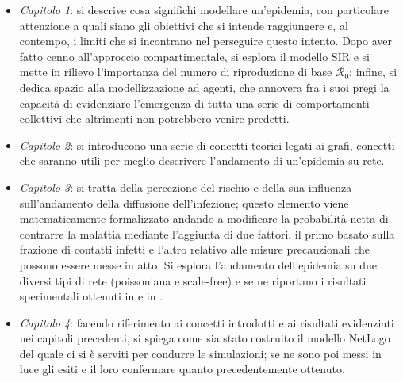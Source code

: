 \begin{itemize}
\item \textit{Capitolo 1}: si descrive cosa significhi modellare un'epidemia, con particolare attenzione a quali siano gli obiettivi che si intende raggiungere e, al contempo, i limiti che si incontrano nel perseguire questo intento. Dopo aver fatto cenno all'approccio compartimentale, si esplora il modello SIR e si mette in rilievo l'importanza del numero di riproduzione di base $\mathcal{R}_0$; infine, si dedica spazio alla modellizzazione ad agenti, che annovera fra i suoi pregi la capacità di evidenziare l'emergenza di tutta una serie di comportamenti collettivi che altrimenti non potrebbero venire predetti.
\item \textit{Capitolo 2}: si introducono una serie di concetti teorici legati ai grafi, concetti che saranno utili per meglio descrivere l'andamento di un'epidemia su rete.
\item \textit{Capitolo 3}: si tratta della percezione del rischio e della sua influenza sull'andamento della diffusione dell'infezione; questo elemento viene matematicamente formalizzato andando a modificare la probabilità netta di contrarre la malattia mediante l'aggiunta di due fattori, il primo basato sulla frazione di contatti infetti e l'altro relativo alle misure precauzionali che possono essere messe in atto. Si esplora l'andamento dell'epidemia su due diversi tipi di rete (poissoniana e scale-free) e se ne riportano i risultati sperimentali ottenuti in \cite{Bagnoli2007} e in \cite{Bagnoli2014}.
\item \textit{Capitolo 4}: facendo riferimento ai concetti introdotti e ai risultati evidenziati nei capitoli precedenti, si spiega come sia stato costruito il modello NetLogo del quale ci si è serviti per condurre le simulazioni; se ne sono poi messi in luce gli esiti e il loro confermare quanto precedentemente ottenuto.
\end{itemize}
